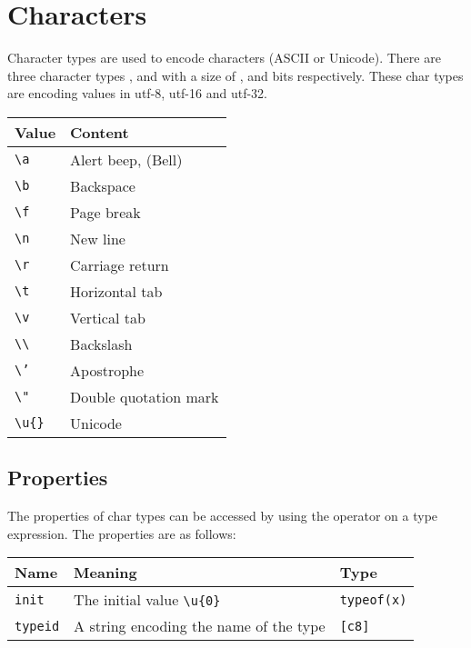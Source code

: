 \section{Characters}
\label{sec:char_type}

Character types are used to encode characters (ASCII or Unicode). There are
three character types ,  and  with a size of
,  and  bits respectively. These char types are
encoding values in utf-8, utf-16 and utf-32.

\begin{center}
  \vspace{-5pt}
  \begin{tabular}{ll}
    Value & Content\\[0pt]
    \hline
    \texttt{\textbackslash{}a} & Alert beep, (Bell)\\[0pt]
    \texttt{\textbackslash{}b} & Backspace\\[0pt]
    \texttt{\textbackslash{}f} & Page break\\[0pt]
    \texttt{\textbackslash{}n} & New line\\[0pt]
    \texttt{\textbackslash{}r} & Carriage return\\[0pt]
    \texttt{\textbackslash{}t} & Horizontal tab\\[0pt]
    \texttt{\textbackslash{}v} & Vertical tab\\[0pt]
    \texttt{\textbackslash{}\textbackslash{}} & Backslash\\[0pt]
    \texttt{\textbackslash{}'} & Apostrophe\\[0pt]
    \texttt{\textbackslash{}"} & Double quotation mark\\[0pt]
    \texttt{\textbackslash{}u\{\}} & Unicode\\[0pt]
  \end{tabular}
\end{center}

\subsection{Properties}
\label{sec:orgf9fbc31}

The properties of char types can be accessed by using the \token{::} operator
on a type expression. The properties are as follows:

\begin{center}
  \vspace{-5pt}
  \begin{adjustbox}{max width=\linewidth}
    \begin{tabular}{|l|ll|}
      \hline
      Name & Meaning & Type\\[0pt]
      \hline
      \hline
      \texttt{init} & The initial value \texttt{\textbackslash{}u\{0\}} & \texttt{typeof(x)}\\[0pt]
      \hline
      \texttt{typeid} & A string encoding the name of the type & \texttt{[c8]}\\[0pt]
      \hline
    \end{tabular}
  \end{adjustbox}
\end{center}


